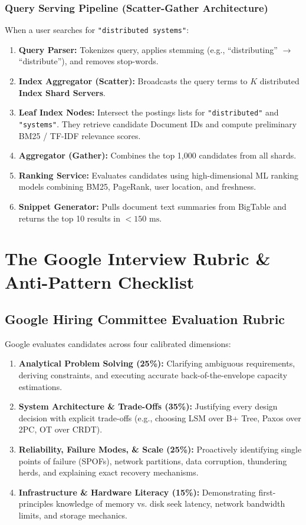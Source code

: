 \documentclass[10pt,journal,compsoc,onecolumn]{IEEEtran}
\begin{document}
\subsubsection{Query Serving Pipeline (Scatter-Gather Architecture)}
When a user searches for \texttt{"distributed systems"}:
\begin{enumerate}
    \item \textbf{Query Parser:} Tokenizes query, applies stemming (e.g., ``distributing'' $\to$ ``distribute''), and removes stop-words.
    \item \textbf{Index Aggregator (Scatter):} Broadcasts the query terms to $K$ distributed \textbf{Index Shard Servers}.
    \item \textbf{Leaf Index Nodes:} Intersect the postings lists for \texttt{"distributed"} and \texttt{"systems"}. They retrieve candidate Document IDs and compute preliminary BM25 / TF-IDF relevance scores.
    \item \textbf{Aggregator (Gather):} Combines the top 1,000 candidates from all shards.
    \item \textbf{Ranking Service:} Evaluates candidates using high-dimensional ML ranking models combining BM25, PageRank, user location, and freshness.
    \item \textbf{Snippet Generator:} Pulls document text summaries from BigTable and returns the top 10 results in $< 150\text{ ms}$.
\end{enumerate}

\section{The Google Interview Rubric \& Anti-Pattern Checklist}
\label{sec:rubric_antipatterns}

\subsection{Google Hiring Committee Evaluation Rubric}
Google evaluates candidates across four calibrated dimensions:
\begin{enumerate}
    \item \textbf{Analytical Problem Solving (25\%):} Clarifying ambiguous requirements, deriving constraints, and executing accurate back-of-the-envelope capacity estimations.
    \item \textbf{System Architecture \& Trade-Offs (35\%):} Justifying every design decision with explicit trade-offs (e.g., choosing LSM over B+ Tree, Paxos over 2PC, OT over CRDT).
    \item \textbf{Reliability, Failure Modes, \& Scale (25\%):} Proactively identifying single points of failure (SPOFs), network partitions, data corruption, thundering herds, and explaining exact recovery mechanisms.
    \item \textbf{Infrastructure \& Hardware Literacy (15\%):} Demonstrating first-principles knowledge of memory vs. disk seek latency, network bandwidth limits, and storage mechanics.
\end{enumerate}
\end{document}
